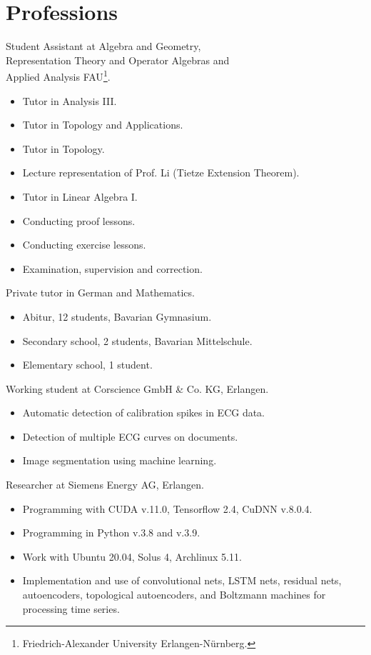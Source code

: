 \documentclass[a4paper, 11pt]{article}
\newcommand{\years}[1]{\marginnote{\scriptsize #1}}
\begin{document}
\section*{Professions}
\years{2023--25} Student Assistant at Algebra and Geometry, \\
Representation Theory and Operator Algebras and \\
Applied Analysis FAU\footnote{Friedrich-Alexander University Erlangen-Nürnberg.}.
\begin{itemize}
	\item Tutor in \glqq Analysis III\grqq.
	\item Tutor in \glqq Topology and Applications\grqq.
	\item Tutor in \glqq Topology\grqq.
	\item Lecture representation of Prof. Li (Tietze Extension Theorem).
	\item Tutor in \glqq Linear Algebra I\grqq.
	\item Conducting proof lessons.
	\item Conducting exercise lessons.
	\item Examination, supervision and correction.
\end{itemize}
\years{2024--25} Private tutor in German and Mathematics.
\begin{itemize}
	\item Abitur, 12 students, Bavarian Gymnasium.
	\item Secondary school, 2 students, Bavarian Mittelschule.
	\item Elementary school, 1 student.
\end{itemize}
\years{2021--22} Working student at Corscience GmbH \& Co. KG, Erlangen.
\begin{itemize}
	\item Automatic detection of calibration spikes in ECG data.
	\item Detection of multiple ECG curves on documents.
	\item Image segmentation using machine learning.
\end{itemize}
\years{2019--21} Researcher at Siemens Energy AG, Erlangen.
\begin{itemize}
	\item Programming with CUDA v.11.0, Tensorflow 2.4, CuDNN v.8.0.4.
	\item Programming in Python v.3.8 and v.3.9.
	\item Work with Ubuntu 20.04, Solus 4, Archlinux 5.11.
	\item Implementation and use of convolutional nets, LSTM nets, residual nets, autoencoders, topological autoencoders, and Boltzmann machines for processing time series.
\end{itemize}
\end{document}
